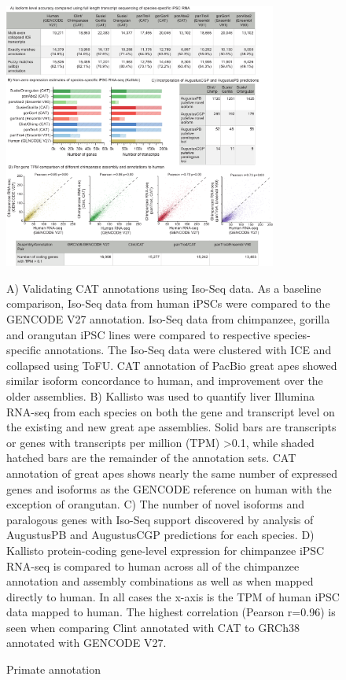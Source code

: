 \documentclass[fleqn,10pt]{wlscirep}
\begin{document}
\begin{figure}
\centering
\includegraphics[width=0.8\textwidth,height=0.8\textheight,keepaspectratio]{figure2-primate_v10.pdf}
\caption{Primate annotation}
A) Validating CAT annotations using Iso-Seq data. As a baseline comparison, Iso-Seq data from human iPSCs were compared to the GENCODE V27 annotation. Iso-Seq data from chimpanzee, gorilla and orangutan iPSC lines were compared to respective species-specific annotations. The Iso-Seq data were clustered with ICE and collapsed using ToFU\cite{gordon2015widespread}. CAT annotation of PacBio great apes showed similar isoform concordance to human, and improvement over the older assemblies. B) Kallisto\cite{bray2015near} was used to quantify liver Illumina RNA-seq from each species on both the gene and transcript level on the existing and new great ape assemblies. Solid bars are transcripts or genes with transcripts per million (TPM) \textgreater 0.1, while shaded hatched bars are the remainder of the annotation sets. CAT annotation of great apes shows nearly the same number of expressed genes and isoforms as the GENCODE reference on human with the exception of orangutan. C) The number of novel isoforms and paralogous genes with Iso-Seq support discovered by analysis of AugustusPB and AugustusCGP predictions for each species. D) Kallisto protein-coding gene-level expression for chimpanzee iPSC RNA-seq is compared to human across all of the chimpanzee annotation and assembly combinations as well as when mapped directly to human. In all cases the x-axis is the TPM of human iPSC data mapped to human. The highest correlation (Pearson r=0.96) is seen when comparing Clint annotated with CAT to GRCh38 annotated with GENCODE V27.
\label{fig:primate}
\end{figure}
\end{document}
